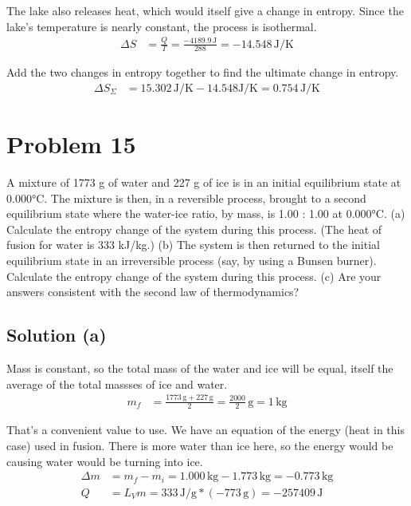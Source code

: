 \documentclass[12pt]{article}
\begin{document}
            The lake also releases heat, which would itself give a change in entropy. 
            Since the lake's temperature is nearly constant, the process is isothermal.
            \begin{align}
                \Delta S    &=  \frac{Q}{T}
                    =   \frac{-4189.9\,\unit{\joule}}{288}
                    =   -14.548\,\unit{\joule/\kelvin}
            \end{align}

            Add the two changes in entropy together to find the ultimate change in entropy.
            \begin{align}
                \Delta S_{\Sigma}   &=  15.302\,\unit{\joule/\kelvin} - 14.548\unit{\joule/\kelvin}
                    =   \boxed{0.754\,\unit{\joule/\kelvin}}
            \end{align}

    \pagebreak
    \section{Problem 15}
        A mixture of 1773 g of water and 227 g of ice is in an initial equilibrium state at 0.000\unit{\celsius}. 
        The mixture is then, in a reversible process, brought to a second equilibrium state where the water-ice ratio, by mass, is 1.00 : 1.00 at 0.000\unit{\celsius}. 
        (a) Calculate the entropy change of the system during this process. 
        (The heat of fusion for water is 333 kJ/kg.) 
        (b) The system is then returned to the initial equilibrium state in an irreversible process (say, by using a Bunsen burner). 
        Calculate the entropy change of the system during this process. 
        (c) Are your answers consistent with the second law of thermodynamics?

        \subsection{Solution (a)}
            Mass is constant, so the total mass of the water and ice will be equal, itself the average of the total massses of ice and water.
            \begin{align}
                m_f &=  \frac{1773\,\unit{\gram} + 227\,\unit{\gram}}{2}
                    =   \frac{2000}{2}\,\unit{\gram}
                    =   1\,\unit{\kilo\gram}
            \end{align}

            That's a convenient value to use.
            We have an equation of the energy (heat in this case) used in fusion. 
            There is more water than ice here, so the energy would be causing water would be turning into ice.
            \begin{align}
                \Delta m    &=  m_f - m_i
                    =   1.000\,\unit{\kilo\gram} - 1.773\,\unit{\kilo\gram}
                    =   -0.773\,\unit{\kilo\gram}\\
                Q   &=  L_V m
                    =   333\,\unit{\joule/\gram} * (-773\,\unit{\gram})
                    =   -257409\,\unit{\joule}
            \end{align}
\end{document}

